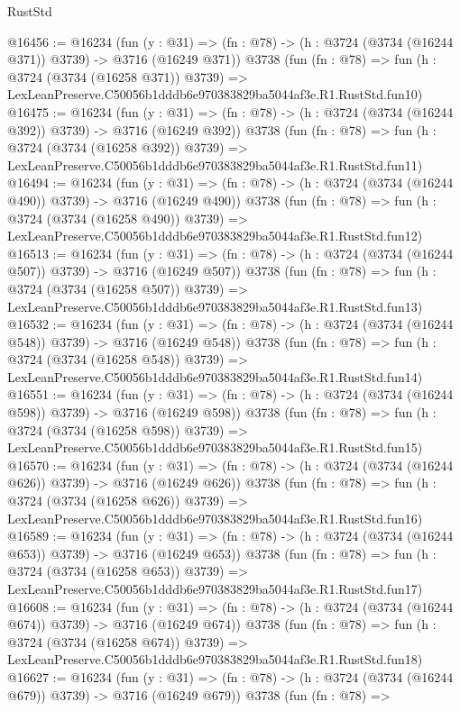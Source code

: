 \begin{lexlean}{RustStd}
\begin{coremodule}
@16456 := @16234
    (fun (y : @31) => (fn : @78) -> (h : @3724 (@3734 (@16244 @371)) @3739) -> @3716 (@16249 @371))
    @3738
    (fun (fn : @78) =>
    fun (h : @3724 (@3734 (@16258 @371)) @3739) =>
    LexLeanPreserve.C50056b1dddb6e970383829ba5044af3e.R1.RustStd.fun10)
@16475 := @16234
    (fun (y : @31) => (fn : @78) -> (h : @3724 (@3734 (@16244 @392)) @3739) -> @3716 (@16249 @392))
    @3738
    (fun (fn : @78) =>
    fun (h : @3724 (@3734 (@16258 @392)) @3739) =>
    LexLeanPreserve.C50056b1dddb6e970383829ba5044af3e.R1.RustStd.fun11)
@16494 := @16234
    (fun (y : @31) => (fn : @78) -> (h : @3724 (@3734 (@16244 @490)) @3739) -> @3716 (@16249 @490))
    @3738
    (fun (fn : @78) =>
    fun (h : @3724 (@3734 (@16258 @490)) @3739) =>
    LexLeanPreserve.C50056b1dddb6e970383829ba5044af3e.R1.RustStd.fun12)
@16513 := @16234
    (fun (y : @31) => (fn : @78) -> (h : @3724 (@3734 (@16244 @507)) @3739) -> @3716 (@16249 @507))
    @3738
    (fun (fn : @78) =>
    fun (h : @3724 (@3734 (@16258 @507)) @3739) =>
    LexLeanPreserve.C50056b1dddb6e970383829ba5044af3e.R1.RustStd.fun13)
@16532 := @16234
    (fun (y : @31) => (fn : @78) -> (h : @3724 (@3734 (@16244 @548)) @3739) -> @3716 (@16249 @548))
    @3738
    (fun (fn : @78) =>
    fun (h : @3724 (@3734 (@16258 @548)) @3739) =>
    LexLeanPreserve.C50056b1dddb6e970383829ba5044af3e.R1.RustStd.fun14)
@16551 := @16234
    (fun (y : @31) => (fn : @78) -> (h : @3724 (@3734 (@16244 @598)) @3739) -> @3716 (@16249 @598))
    @3738
    (fun (fn : @78) =>
    fun (h : @3724 (@3734 (@16258 @598)) @3739) =>
    LexLeanPreserve.C50056b1dddb6e970383829ba5044af3e.R1.RustStd.fun15)
@16570 := @16234
    (fun (y : @31) => (fn : @78) -> (h : @3724 (@3734 (@16244 @626)) @3739) -> @3716 (@16249 @626))
    @3738
    (fun (fn : @78) =>
    fun (h : @3724 (@3734 (@16258 @626)) @3739) =>
    LexLeanPreserve.C50056b1dddb6e970383829ba5044af3e.R1.RustStd.fun16)
@16589 := @16234
    (fun (y : @31) => (fn : @78) -> (h : @3724 (@3734 (@16244 @653)) @3739) -> @3716 (@16249 @653))
    @3738
    (fun (fn : @78) =>
    fun (h : @3724 (@3734 (@16258 @653)) @3739) =>
    LexLeanPreserve.C50056b1dddb6e970383829ba5044af3e.R1.RustStd.fun17)
@16608 := @16234
    (fun (y : @31) => (fn : @78) -> (h : @3724 (@3734 (@16244 @674)) @3739) -> @3716 (@16249 @674))
    @3738
    (fun (fn : @78) =>
    fun (h : @3724 (@3734 (@16258 @674)) @3739) =>
    LexLeanPreserve.C50056b1dddb6e970383829ba5044af3e.R1.RustStd.fun18)
@16627 := @16234
    (fun (y : @31) => (fn : @78) -> (h : @3724 (@3734 (@16244 @679)) @3739) -> @3716 (@16249 @679))
    @3738
    (fun (fn : @78) =>

\end{coremodule}
\end{lexlean}
